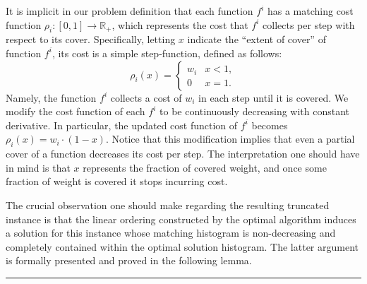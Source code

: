 \documentclass[11pt]{article}
\theoremstyle{plain}
\theoremstyle{definition}
\newcommand{\qedsymb}{\hfill{\rule{2mm}{2mm}}}
\renewenvironment{proof}{\begin{trivlist} \item[\hspace{\labelsep}{\bf \noindent Proof.\/}] }{\qedsymb\end{trivlist}}\newenvironment{proofof}[1]{\begin{trivlist} \item[\hspace{\labelsep}{\bf \noindent Proof of #1.\/}] }{\qedsymb\end{trivlist}}\newenvironment{MyEqn}[1]{\setlength\arraycolsep{2pt}\begin{eqnarray*} #1}{\end{eqnarray*}}
\newcommand{\bbR}{\mathbb{R}}
\begin{document}
\begin{proof}
It is implicit in our problem definition that each function $f^i$
has a matching cost function $\rho_i: [0,1] \rightarrow \bbR_{+}$,
which represents the cost that $f^i$ collects per step with
respect to its cover. Specifically, letting $x$ indicate the
``extent of cover'' of function $f^i$, its cost is a simple
step-function, defined as follows:
$$
\rho_i(x) =
\begin{cases}
w_i & x < 1, \\
0 & x = 1.
\end{cases}
$$
Namely, the function $f^i$ collects a cost of $w_i$ in each step
until it is covered. We modify the cost function of each $f^i$ to
be continuously decreasing with constant derivative. In
particular, the updated cost function of $f^i$ becomes $\rho_i(x)
= w_i \cdot (1 - x)$. Notice that this modification implies that
even a partial cover of a function decreases its cost per step.
The interpretation one should have in mind is that $x$ represents
the fraction of covered weight, and once some fraction of weight
is covered it stops incurring cost.

\medskip The crucial observation one should make regarding the
resulting truncated instance is that the linear ordering
constructed by the optimal algorithm induces a solution for this
instance whose matching histogram is non-decreasing and completely
contained within the optimal solution histogram. The latter
argument is formally presented and proved in the following lemma.


\end{proof}
\end{document}
